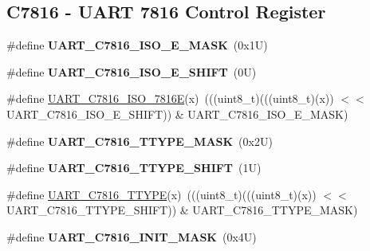 \subsection*{C7816 -\/ U\+A\+RT 7816 Control Register}
\begin{DoxyCompactItemize}
\item 
\mbox{\label{group___u_a_r_t___register___masks_gae34238a46464deaac39303c8b11431a2}} 
\#define {\bfseries U\+A\+R\+T\+\_\+\+C7816\+\_\+\+I\+S\+O\+\_\+E\+\_\+\+M\+A\+SK}~(0x1\+U)
\item 
\mbox{\label{group___u_a_r_t___register___masks_gaee54546d1f78919cbcae5b7a5ec44f17}} 
\#define {\bfseries U\+A\+R\+T\+\_\+\+C7816\+\_\+\+I\+S\+O\+\_\+E\+\_\+\+S\+H\+I\+FT}~(0\+U)
\item 
\#define \mbox{\hyperlink{group___u_a_r_t___register___masks_ga66f91cf519df746474ee52bd1bf7e71a}{U\+A\+R\+T\+\_\+\+C7816\+\_\+\+I\+S\+O\+\_\+7816E}}(x)~(((uint8\+\_\+t)(((uint8\+\_\+t)(x)) $<$$<$ U\+A\+R\+T\+\_\+\+C7816\+\_\+\+I\+S\+O\+\_\+E\+\_\+\+S\+H\+I\+FT)) \& U\+A\+R\+T\+\_\+\+C7816\+\_\+\+I\+S\+O\+\_\+E\+\_\+\+M\+A\+SK)
\item 
\mbox{\label{group___u_a_r_t___register___masks_ga5c2601e69d81abd9d74da1eedefe0073}} 
\#define {\bfseries U\+A\+R\+T\+\_\+\+C7816\+\_\+\+T\+T\+Y\+P\+E\+\_\+\+M\+A\+SK}~(0x2\+U)
\item 
\mbox{\label{group___u_a_r_t___register___masks_ga53eb4e563ed15c4c1e73d1fd15a77b2e}} 
\#define {\bfseries U\+A\+R\+T\+\_\+\+C7816\+\_\+\+T\+T\+Y\+P\+E\+\_\+\+S\+H\+I\+FT}~(1\+U)
\item 
\#define \mbox{\hyperlink{group___u_a_r_t___register___masks_gaf3a33b295da01f9685476c4c0b5f6350}{U\+A\+R\+T\+\_\+\+C7816\+\_\+\+T\+T\+Y\+PE}}(x)~(((uint8\+\_\+t)(((uint8\+\_\+t)(x)) $<$$<$ U\+A\+R\+T\+\_\+\+C7816\+\_\+\+T\+T\+Y\+P\+E\+\_\+\+S\+H\+I\+FT)) \& U\+A\+R\+T\+\_\+\+C7816\+\_\+\+T\+T\+Y\+P\+E\+\_\+\+M\+A\+SK)
\item 
\mbox{\label{group___u_a_r_t___register___masks_ga52afeea9fbaec9489c45792a907b195b}} 
\#define {\bfseries U\+A\+R\+T\+\_\+\+C7816\+\_\+\+I\+N\+I\+T\+\_\+\+M\+A\+SK}~(0x4\+U)
\item 

\end{DoxyCompactItemize}
